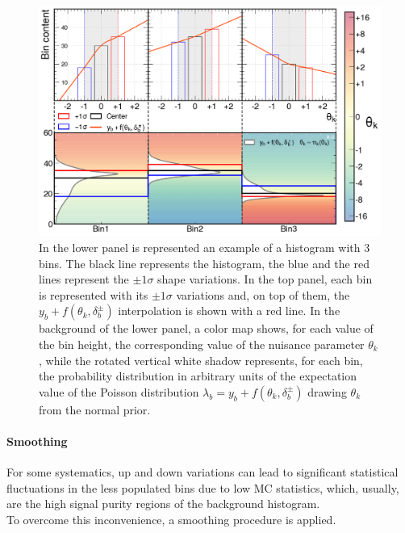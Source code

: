 \begin{figure}[h!]
    \centering
    \includegraphics[width=\linewidth]{fig//chap05-stats/morphing.png}
    \caption{In the lower panel is represented an example of a histogram with 3 bins. The black line represents the histogram, the blue and the red lines represent the $\pm 1 \sigma$ shape variations.
    In the top panel, each bin is represented with its $\pm 1 \sigma$ variations and, on top of them, the $y_b+f(\theta_k,\delta_b^\pm)$ interpolation is shown with a red line. In the background of the lower panel, a color map shows, for each value of the bin height, the corresponding value of the nuisance parameter $\theta_k$, while the rotated vertical white shadow represents, for each bin, the probability distribution in arbitrary units of the expectation value of the Poisson distribution $\lambda_b=y_b+f(\theta_k,\delta_b^\pm)$ drawing $\theta_k$ from the normal prior.}
    \label{fig:morphing}
\end{figure}
\newpage
\vspace{0.5cm}
\paragraph*{Smoothing}
For some systematics, up and down variations can lead to significant statistical fluctuations in the less populated bins due to low MC statistics, which, usually, are the high signal purity regions of the background histogram.\\
To overcome this inconvenience, a smoothing procedure is applied.

